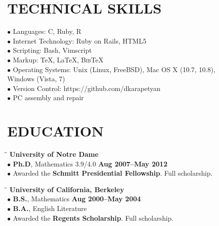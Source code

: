 \documentclass{resume}
\begin{document}
 
\address{\hspace{1.2in} 202-460-5173\\
    \hspace{0.7in}  \href{mailto:david.karapetyan@gmail.com}{david.karapetyan@gmail.com}\\
\hspace{0.7in}   \href{http://davidkarapetyan.com}{http://davidkarapetyan.com}}
\begin{resume}
    \vspace{0.1in}
    \section{TECHNICAL SKILLS}
    \vspace{0.03in}
    $\bullet$ Languages: C, Ruby, R 
    \\
    $\bullet$ Internet Technology: Ruby on Rails, HTML5
    \\
    $\bullet$ Scripting: Bash, Vimscript 
    \\
    $\bullet$ Markup: \TeX{}, \LaTeX{}, B\textsc{ib}\TeX{}
    \\
    $\bullet$ Operating Systems: Unix (Linux, FreeBSD), Mac OS X (10.7, 10.8), \\
    \phantom{$\bullet$} Windows (Vista, 7) 
    \\
    $\bullet$ Version Control: https://github.com/dkarapetyan \\
    $\bullet$ PC assembly and repair 
    \section{EDUCATION} 
    \vspace{-0.1in}
    \begin{tabbing}
        \hspace{2.3in}\= \hspace{2.6in}\= \kill
        \textbf{University of Notre Dame} \\
        $\bullet$ \textbf{Ph.D}, Mathematics 3.9/4.0 \>\>\textbf{Aug 2007--May 2012}
        \\ 
        $\bullet$ Awarded the \textbf{Schmitt Presidential Fellowship}. Full scholarship. \\
    \end{tabbing}	
    \vspace{-0.5in} 
    \begin{tabbing}
        \hspace{2.3in}\= \hspace{2.6in}\= \kill
        \textbf{University of California, Berkeley}
        \\
        $\bullet$ \textbf{B.S.}, Mathematics \>\>\textbf{Aug 2000--May 2004}
        \\
        $\bullet$ \textbf{B.A.}, English Literature 
        \\
        $\bullet$ Awarded the \textbf{Regents Scholarship}. Full scholarship.


\end{tabbing}
\end{resume}
\end{document}

